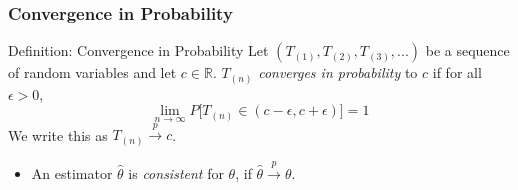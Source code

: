\documentclass[12pt, block=fill]{beamer}
\newcommand{\E}{\text{E}}
\newcommand{\V}{\text{V}}
\newcommand{\R}{\mathbb{R}}
\begin{document}
%
%

\begin{frame}
  \frametitle{Convergence in Probability}

  \begin{block}{Definition: Convergence in Probability} 
    Let $( T_{(1)}, T_{(2)}, T_{(3)},...) $ be a sequence of random variables and let $c\in \R$. $T_{(n)}$  \textit{converges in probability} to $c$ if for all $\epsilon > 0$, 
    $$\lim_{n \rightarrow \infty} P\Big[ T_{(n)}  \in (c-\epsilon, c+\epsilon) \Big] = 1$$
    We write this as $T_{(n)} \overset{p}{\rightarrow} c$.
      \end{block} 
      
      \begin{itemize}
\item An estimator $\hat \theta$ is \textit{consistent} for $\theta$, if $\hat \theta \overset{p}{\rightarrow} \theta$.
\end{itemize}

\end{frame}
\end{document}
